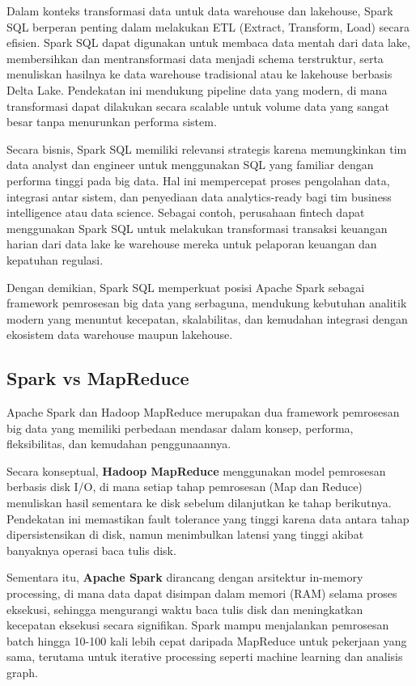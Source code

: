 Dalam konteks transformasi data untuk data warehouse dan lakehouse, Spark SQL berperan penting dalam melakukan ETL (Extract, Transform, Load) secara efisien. Spark SQL dapat digunakan untuk membaca data mentah dari data lake, membersihkan dan mentransformasi data menjadi schema terstruktur, serta menuliskan hasilnya ke data warehouse tradisional atau ke lakehouse berbasis Delta Lake. Pendekatan ini mendukung pipeline data yang modern, di mana transformasi dapat dilakukan secara scalable untuk volume data yang sangat besar tanpa menurunkan performa sistem.

Secara bisnis, Spark SQL memiliki relevansi strategis karena memungkinkan tim data analyst dan engineer untuk menggunakan SQL yang familiar dengan performa tinggi pada big data. Hal ini mempercepat proses pengolahan data, integrasi antar sistem, dan penyediaan data analytics-ready bagi tim business intelligence atau data science. Sebagai contoh, perusahaan fintech dapat menggunakan Spark SQL untuk melakukan transformasi transaksi keuangan harian dari data lake ke warehouse mereka untuk pelaporan keuangan dan kepatuhan regulasi.

Dengan demikian, Spark SQL memperkuat posisi Apache Spark sebagai framework pemrosesan big data yang serbaguna, mendukung kebutuhan analitik modern yang menuntut kecepatan, skalabilitas, dan kemudahan integrasi dengan ekosistem data warehouse maupun lakehouse.


\subsection{Spark vs MapReduce}

Apache Spark dan Hadoop MapReduce merupakan dua framework pemrosesan big data yang memiliki perbedaan mendasar dalam konsep, performa, fleksibilitas, dan kemudahan penggunaannya.

Secara konseptual, \textbf{Hadoop MapReduce} menggunakan model pemrosesan berbasis disk I/O, di mana setiap tahap pemrosesan (Map dan Reduce) menuliskan hasil sementara ke disk sebelum dilanjutkan ke tahap berikutnya. Pendekatan ini memastikan fault tolerance yang tinggi karena data antara tahap dipersistensikan di disk, namun menimbulkan latensi yang tinggi akibat banyaknya operasi baca tulis disk.

Sementara itu, \textbf{Apache Spark} dirancang dengan arsitektur in-memory processing, di mana data dapat disimpan dalam memori (RAM) selama proses eksekusi, sehingga mengurangi waktu baca tulis disk dan meningkatkan kecepatan eksekusi secara signifikan. Spark mampu menjalankan pemrosesan batch hingga 10-100 kali lebih cepat daripada MapReduce untuk pekerjaan yang sama, terutama untuk iterative processing seperti machine learning dan analisis graph.

